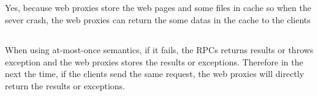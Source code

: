 \documentclass[11pt]{article}
\begin{document}
\subsection{}
Yes, because web proxies store the web pages and some files in cache so when the sever crash, the web proxies can return the some datas in the cache to the clients

\subsection{}
When using at-most-once semantics, if it fails, the RPCs returns results or throws exception and the web proxies stores the results or exceptions. Therefore in the next the time, if the clients send the same request, the web proxies will directly return the results or exceptions.
\end{document}
